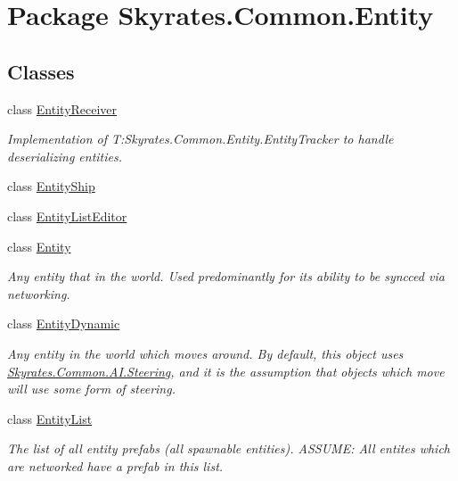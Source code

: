 \hypertarget{namespace_skyrates_1_1_common_1_1_entity}{\section{Package Skyrates.\-Common.\-Entity}
\label{namespace_skyrates_1_1_common_1_1_entity}
}
\subsection*{Classes}
\begin{DoxyCompactItemize}
\item 
class \hyperlink{class_skyrates_1_1_common_1_1_entity_1_1_entity_receiver}{Entity\-Receiver}
\begin{DoxyCompactList}\small\item\em Implementation of T\-:\-Skyrates.\-Common.\-Entity.\-Entity\-Tracker to handle deserializing entities. \end{DoxyCompactList}\item 
class \hyperlink{class_skyrates_1_1_common_1_1_entity_1_1_entity_ship}{Entity\-Ship}
\item 
class \hyperlink{class_skyrates_1_1_common_1_1_entity_1_1_entity_list_editor}{Entity\-List\-Editor}
\item 
class \hyperlink{class_skyrates_1_1_common_1_1_entity_1_1_entity}{Entity}
\begin{DoxyCompactList}\small\item\em Any entity that in the world. Used predominantly for its ability to be syncced via networking. \end{DoxyCompactList}\item 
class \hyperlink{class_skyrates_1_1_common_1_1_entity_1_1_entity_dynamic}{Entity\-Dynamic}
\begin{DoxyCompactList}\small\item\em Any entity in the world which moves around. By default, this object uses \hyperlink{class_skyrates_1_1_common_1_1_a_i_1_1_steering}{Skyrates.\-Common.\-A\-I.\-Steering}, and it is the assumption that objects which move will use some form of steering. \end{DoxyCompactList}\item 
class \hyperlink{class_skyrates_1_1_common_1_1_entity_1_1_entity_list}{Entity\-List}
\begin{DoxyCompactList}\small\item\em The list of all entity prefabs (all spawnable entities). A\-S\-S\-U\-M\-E\-: All entites which are networked have a prefab in this list. \end{DoxyCompactList}\item 

\end{DoxyCompactItemize}
